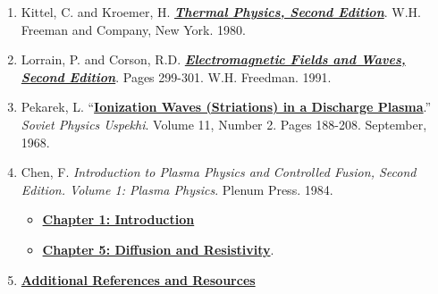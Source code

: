 \documentclass{../lab}
\begin{document}
\begin{enumerate}
    \item Kittel, C. and Kroemer, H. \href{https://drive.google.com/file/d/1PRz8X9WIDkVBk5ikSWJV7HmI-QDSjUg3/view?usp=drive_link}{\textbf{\emph{Thermal Physics, Second Edition}}}. W.H. Freeman and Company, New York. 1980.

    \item Lorrain, P. and Corson, R.D. \href{https://drive.google.com/file/d/12wFeni5qzMNPmPYR-n9t-g5_qpx8j37H/view?usp=drive_link}{\textbf{\emph{Electromagnetic Fields and Waves, Second Edition}}}. Pages 299-301. W.H. Freedman. 1991.

    \item Pekarek, L. ``\href{https://drive.google.com/file/d/1CEPXzrPieHXJcXKx4FOO26GpraLOGZ5P/view?usp=drive_link}{\textbf{Ionization Waves (Striations) in a Discharge Plasma}}.'' \emph{Soviet Physics Uspekhi}. Volume 11, Number 2. Pages 188-208. September, 1968.

    \item Chen, F.
    \emph{Introduction to Plasma Physics and Controlled Fusion, Second Edition. Volume 1: Plasma Physics}. Plenum Press. 1984.  
    \begin{itemize} 
        \item\href{https://drive.google.com/file/d/19BMdBtDsFpuoRfBIB3wQYgViKa26H31-/view?usp=drive_link}{\textbf{Chapter 1: Introduction}} \item \href{https://drive.google.com/file/d/1gJtgKJB9HLV_7rYu0ZEw3RbB9r1S_QeY/view?usp=drive_link}{\textbf{Chapter 5: Diffusion and Resistivity}}.
        
    \end{itemize}
    \item\href{https://drive.google.com/file/d/11HxrEbTIuEAgSkI4XU_Cq8diI1wu5zfy/view?usp=drive_link}{\textbf{Additional References and Resources}}

\end{enumerate}
\end{document}

